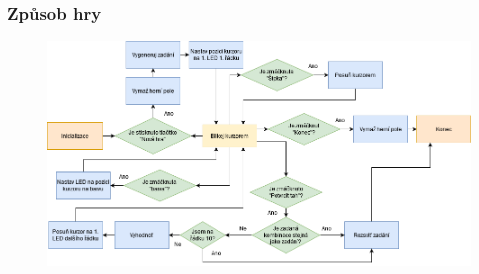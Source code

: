 \documentclass[%
  12pt,       				%
	t,                  %
	aspectratio=1610,   %
	unicode,						%
]{beamer}				    	%
\begin{document}
\begin{frame} 
	\frametitle{Způsob hry}
	\begin{figure}%
		\centering
		\includegraphics[width=1\columnwidth]{obrazky/vyvojovy_diagram_prezentace.png}
	\end{figure}%
\end{frame}
\end{document}
